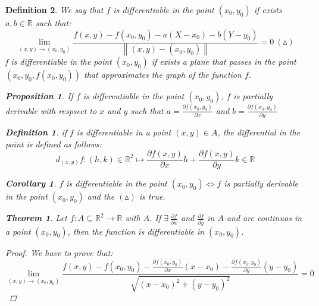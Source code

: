 \documentclass{article}
\newtheorem{theorem}{Theorem}
\newtheorem{proposition}{Proposition}
\newtheorem{definition}{Definition}
\newtheorem{corollary}{Corollary}
\begin{document}
    \begin{definition}
        We say that $f$ is differentiable in the point $(x_0, y_0)$ if exists $a,b \in \mathbb{R}$ such that:
        \begin{equation*}
            \lim_{(x, y) \to (x_0,y_0)} \frac{f(x,y)-f(x_0,y_0)-a(X-x_0)-b(Y-y_0)}{\left\lVert (x,y) - (x_0,y_0)\right\rVert } = 0  \ (\vartriangle) 
        \end{equation*}
        f is differentiable in the point $(x_0,y_0)$ if exists a plane that passes in the point $(x_0,y_0, f(x_0,y_0))$ that approximates the graph of the function $f$.
        \begin{proposition}
            If $f$ is differentiable in the point $(x_0,y_0)$, $f$ is partially derivable with respsect to $x$ and $y$ such that $a = \frac{\partial f(x_0,y_0)}{ \partial x}$ and $b = \frac{\partial f(x_0,y_0)}{ \partial y}$  
        \end{proposition}
        \begin{definition}
            if $f$ is differentiable in a point $(x,y) \in A$, the differential in the point is defined as follows:
            \begin{equation*}
                d_{(x,y)}f:(h,k) \in \mathbb{R}^2 \longmapsto \frac{\partial f(x,y)}{\partial x}h + \frac{\partial f(x,y)}{\partial y}k \in \mathbb{R}
            \end{equation*}
        \end{definition}
        \begin{corollary}
            $f$ is differentiable in the point $(x_0,y_0) \Longleftrightarrow f$ is partially derivable in the point $(x_0,y_0)$ and the $(\vartriangle)$ is true.
        \end{corollary}
    \newpage
        \begin{theorem}
            Let $f : A \subseteq \mathbb{R}^2 \rightarrow \mathbb{R}$ with $A$. If $\exists \ \frac{\partial f}{\partial x}$ and $\frac{\partial f}{\partial y}$ in $A$ and are continuos in a point $(x_0,y_0)$, then the function is differentiable in $(x_0,y_0)$.
            \begin{proof}
                We have to prove that:
                \begin{equation*}
                    \lim_{(x,y) \to (x_0,y_0)}\frac{f(x,y) - f(x_0,y_0) - \frac{\partial f(x_0,y_0)}{\partial x}(x-x_0) - \frac{\partial f(x_0,y_0)}{\partial y}(y-y_0)}{\sqrt{(x-x_0)^2 + (y-y_0)^2}} = 0
                \end{equation*}

\end{proof}
\end{theorem}
\end{definition}
\end{document}
